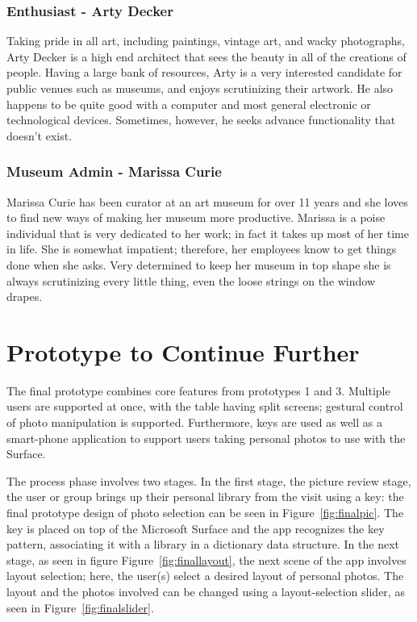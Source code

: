 \documentclass{tei2013}
\begin{document}
\subsubsection{Enthusiast - Arty Decker}
Taking pride in all art, including paintings, vintage art, and wacky photographs, Arty Decker is a high end architect that sees the beauty in all of the creations of people. Having a large bank of resources, Arty is a very interested candidate for public venues such as museums, and enjoys scrutinizing their artwork. He also happens to be quite good with a computer and most general electronic or technological devices. Sometimes, however, he seeks advance functionality that doesn't exist. 

\subsubsection{Museum Admin - Marissa Curie}
Marissa Curie has been curator at an art museum for over 11 years and she loves to find new ways of making her museum more productive. Marissa is a poise individual that is very dedicated to her work; in fact it takes up most of her time in life. She is somewhat impatient; therefore, her employees know to get things done when she asks. Very determined to keep her museum in top shape she is always scrutinizing every little thing, even the loose strings on the window drapes. 


\section{Prototype to Continue Further}
The final prototype combines core features from prototypes 1 and 3. Multiple users are supported at once, with the table having split screens; gestural control of photo manipulation is supported. Furthermore, keys are used as well as a smart-phone application to support users taking personal photos to use with the Surface.

The process phase involves two stages. In the first stage, the picture review stage, the user or group brings up their personal library from the visit using a key: the final prototype design of photo selection can be seen in Figure~\ref{fig:finalpic}. The key is placed on top of the Microsoft Surface and the app recognizes the key pattern, associating it with a library in a dictionary data structure. In the next stage, as seen in figure Figure~\ref{fig:finallayout}, the next scene of the app involves layout selection; here, the user(s) select a desired layout of personal photos. The layout and the photos involved can be changed using a layout-selection slider, as seen in Figure~\ref{fig:finalslider}.
\end{document}

